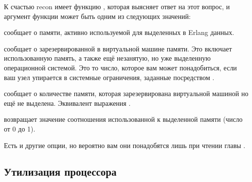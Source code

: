 К счастью recon имеет функцию , которая выясняет ответ на этот вопрос, и аргумент функции может быть одним из следующих значений:

\begin{itemize*}
	\item {} сообщает о памяти, активно используемой для выделенных в Erlang данных.
	\item {} сообщает о зарезервированной в виртуальной машине памяти. Это включает использованную память, а также ещё незанятую, но уже выделенную операционной системой. Это то число, которое вам может понадобиться, если ваш узел упирается в системные ограничения, заданные посредством .
	\item {} сообщает о количестве памяти, которая зарезервирована виртуальной машиной но ещё не выделена. Эквивалент выражения .
	\item {} возвращает значение соотношения использованной к выделенной памяти (число от 0 до 1).
\end{itemize*}

Есть и другие опции, но вероятно вам они понадобятся лишь при чтении главы .

\subsection{Утилизация процессора}
\label{subsec:global-cpu}

